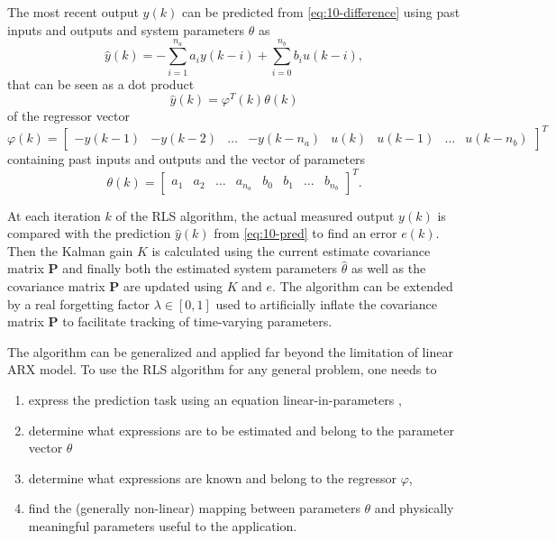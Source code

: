 The most recent output $y(k)$ can be predicted from \eqref{eq:10-difference} using past inputs and outputs and system parameters $\theta$ as
\begin{equation}
        \hat{y}(k) = - \sum_{i=1}^{n_a} a_i y(k-i) + \sum_{i=0}^{n_b} b_i u(k-i) ,
\end{equation}
that can be seen as a dot product
\begin{equation}
        \hat{y}(k) = \varphi^T(k) \theta(k)
        \label{eq:10-pred}
\end{equation}
of the regressor vector 
\begin{equation}
    \varphi(k) = \begin{bmatrix} -y(k-1) &-y(k-2) &\dots & -y(k-n_a) & u(k) & u(k-1) &\dots& u(k-n_b) \end{bmatrix}^T
\end{equation}
containing past inputs and outputs and the vector of parameters
\begin{equation}
    \theta(k) = \begin{bmatrix} a_1 & a_2 & \dots & a_{n_a} & b_0 & b_1 & \dots & b_{n_b} \end{bmatrix}^T.
\end{equation}

At each iteration $k$ of the RLS algorithm, the actual measured output $y(k)$ is compared with the prediction $\hat{y}(k)$ from \eqref{eq:10-pred} to find an error $e(k)$. Then the Kalman gain $K$ is calculated using the current estimate covariance matrix $\mathbf{P}$ and finally both the estimated system parameters $\hat{\theta}$ as well as the covariance matrix $\mathbf{P}$ are updated using $K$ and $e$. The algorithm can be extended by a real forgetting factor $\lambda \in \left[0, 1\right]$ used to artificially inflate the covariance matrix $\mathbf{P}$ to facilitate tracking of time-varying parameters.

The algorithm can be generalized and applied far beyond the limitation of linear ARX model. To use the RLS algorithm for any general problem, one needs to
\begin{enumerate}
    \item express the prediction task using an equation linear-in-parameters ,
    \item determine what expressions are to be estimated and belong to the parameter vector $\theta$
    \item determine what expressions are known  and belong to the regressor $\varphi$,
    \item find the (generally non-linear) mapping between parameters $\theta$ and physically meaningful parameters useful to the application.
\end{enumerate}

